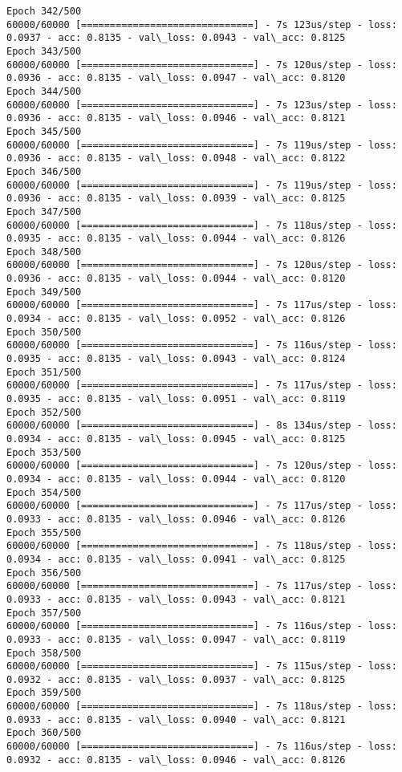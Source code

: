 \documentclass[11pt]{article}
\begin{document}
\begin{Verbatim}[commandchars=\\\{\}]
Epoch 342/500
60000/60000 [==============================] - 7s 123us/step - loss: 0.0937 - acc: 0.8135 - val\_loss: 0.0943 - val\_acc: 0.8125
Epoch 343/500
60000/60000 [==============================] - 7s 120us/step - loss: 0.0936 - acc: 0.8135 - val\_loss: 0.0947 - val\_acc: 0.8120
Epoch 344/500
60000/60000 [==============================] - 7s 123us/step - loss: 0.0936 - acc: 0.8135 - val\_loss: 0.0946 - val\_acc: 0.8121
Epoch 345/500
60000/60000 [==============================] - 7s 119us/step - loss: 0.0936 - acc: 0.8135 - val\_loss: 0.0948 - val\_acc: 0.8122
Epoch 346/500
60000/60000 [==============================] - 7s 119us/step - loss: 0.0936 - acc: 0.8135 - val\_loss: 0.0939 - val\_acc: 0.8125
Epoch 347/500
60000/60000 [==============================] - 7s 118us/step - loss: 0.0935 - acc: 0.8135 - val\_loss: 0.0944 - val\_acc: 0.8126
Epoch 348/500
60000/60000 [==============================] - 7s 120us/step - loss: 0.0936 - acc: 0.8135 - val\_loss: 0.0944 - val\_acc: 0.8120
Epoch 349/500
60000/60000 [==============================] - 7s 117us/step - loss: 0.0934 - acc: 0.8135 - val\_loss: 0.0952 - val\_acc: 0.8126
Epoch 350/500
60000/60000 [==============================] - 7s 116us/step - loss: 0.0935 - acc: 0.8135 - val\_loss: 0.0943 - val\_acc: 0.8124
Epoch 351/500
60000/60000 [==============================] - 7s 117us/step - loss: 0.0935 - acc: 0.8135 - val\_loss: 0.0951 - val\_acc: 0.8119
Epoch 352/500
60000/60000 [==============================] - 8s 134us/step - loss: 0.0934 - acc: 0.8135 - val\_loss: 0.0945 - val\_acc: 0.8125
Epoch 353/500
60000/60000 [==============================] - 7s 120us/step - loss: 0.0934 - acc: 0.8135 - val\_loss: 0.0944 - val\_acc: 0.8120
Epoch 354/500
60000/60000 [==============================] - 7s 117us/step - loss: 0.0933 - acc: 0.8135 - val\_loss: 0.0946 - val\_acc: 0.8126
Epoch 355/500
60000/60000 [==============================] - 7s 118us/step - loss: 0.0934 - acc: 0.8135 - val\_loss: 0.0941 - val\_acc: 0.8125
Epoch 356/500
60000/60000 [==============================] - 7s 117us/step - loss: 0.0933 - acc: 0.8135 - val\_loss: 0.0943 - val\_acc: 0.8121
Epoch 357/500
60000/60000 [==============================] - 7s 116us/step - loss: 0.0933 - acc: 0.8135 - val\_loss: 0.0947 - val\_acc: 0.8119
Epoch 358/500
60000/60000 [==============================] - 7s 115us/step - loss: 0.0932 - acc: 0.8135 - val\_loss: 0.0937 - val\_acc: 0.8125
Epoch 359/500
60000/60000 [==============================] - 7s 118us/step - loss: 0.0933 - acc: 0.8135 - val\_loss: 0.0940 - val\_acc: 0.8121
Epoch 360/500
60000/60000 [==============================] - 7s 116us/step - loss: 0.0932 - acc: 0.8135 - val\_loss: 0.0946 - val\_acc: 0.8126

\end{Verbatim}
\end{document}
